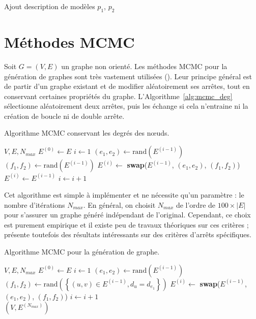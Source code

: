 \documentclass[a4paper]{article}
\begin{document}
\begin{todo}
Ajout description de modèles $p_1$, $p_2$
\end{todo}

\section{Méthodes MCMC}
\label{sec:methodes_mcmc}
    Soit $G = (V, E)$ un graphe non orienté.
    Les méthodes MCMC pour la génération de graphes sont très vastement
    utilisées (\cite{rao1996markov}). Leur principe général est de partir
    d'un graphe existant et de modifier aléatoirement ses arrêtes, tout en
    conservant certaines propriétés du graphe. L'Algorithme~\ref{alg:mcmc_deg}
    sélectionne aléatoirement deux arrêtes, puis les échange si cela
    n'entraine ni la création de boucle ni de double arrête.

    \begin{algorithm}
        \caption{Algorithme MCMC conservant les degrés des n\oe{}uds.}
        \label{alg:mcmc_deg}
        \begin{algorithmic}[1]
            \Require $V, E, N_{max}$
            \State $E^{(0)} \gets E$
            \State $i \gets 1$
                \State $(e_1, e_2) \gets \text{rand}(E^{(i-1)})$
                \State $(f_1, f_2) \gets \text{rand}(E^{(i-1)})$
                    \State $E^{(i)} \gets$
                        \textbf{swap}($E^{(i-1)}$, $(e_1, e_2)$, $(f_1, f_2)$)
                \Else
                    \State $E^{(i)} \gets E^{(i-1)}$
                \EndIf
                \State $i \gets i + 1$
            \EndWhile
        \end{algorithmic}
    \end{algorithm}

    Cet algorithme est simple à implémenter et ne nécessite qu'un paramètre :
    le nombre d'itérations $N_{max}$. En général, on choisit $N_{max}$ de
    l'ordre de $100 \times |E|$ pour s'assurer un graphe généré indépendant de
    l'original. Cependant, ce choix est purement empirique et il existe peu
    de travaux théoriques sur ces critères ; \cite{ray2012we} présente
    toutefois des résultats intéressants sur des critères d'arrêts spécifiques.

    \begin{algorithm}
        \caption{Algorithme MCMC pour la génération de graphe.}
        \label{alg:mcmc_joint}
        \begin{algorithmic}
            \Require $V, E, N_{max}$
            \State $E^{(0)} \gets E$
            \State $i \gets 1$
                \State $(e_1, e_2) \gets \text{rand}(E^{(i-1)})$
                \State $(f_1, f_2) \gets \text{rand}(\left\{ (u, v) \in E^{(i-1)}, d_u = d_{e_1} \right\})$
                \State $E^{(i)} \gets$
                    \textbf{swap}($E^{(i-1)}$, $(e_1, e_2)$, $(f_1, f_2)$)
                \State $i \gets i + 1$
            \EndWhile \\
            \Return $(V, E^{(N_{max})})$
        \end{algorithmic}
    \end{algorithm}
\end{document}
